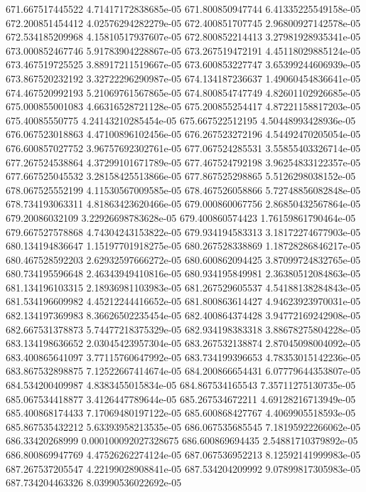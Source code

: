 {671.667517445522 4.71417172838685e-05
671.800850947744 6.41335225549158e-05
672.200851454412 4.02576294282279e-05
672.400851707745 2.96800927142578e-05
672.534185209968 4.15810517937607e-05
672.800852214413 3.27981928935341e-05
673.000852467746 5.91783904228867e-05
673.267519472191 4.45118029885124e-05
673.467519725525 3.88917211519667e-05
673.600853227747 3.65399244606939e-05
673.867520232192 3.32722296290987e-05
674.134187236637 1.49060454836641e-05
674.467520992193 5.21069761567865e-05
674.800854747749 4.82601102926685e-05
675.000855001083 4.66316528721128e-05
675.200855254417 4.87221158817203e-05
675.40085550775 4.24143210285454e-05
675.667522512195 4.50448993428936e-05
676.067523018863 4.47100896102456e-05
676.267523272196 4.54492470205054e-05
676.600857027752 3.96757692302761e-05
677.067524285531 3.55855403326714e-05
677.267524538864 4.37299101671789e-05
677.467524792198 3.96254833122357e-05
677.667525045532 3.28158425513866e-05
677.867525298865 5.5126298038152e-05
678.067525552199 4.11530567009585e-05
678.467526058866 5.72748856082848e-05
678.734193063311 4.81863423620466e-05
679.000860067756 2.86850432567864e-05
679.20086032109 3.22926698783628e-05
679.400860574423 1.76159861790464e-05
679.667527578868 4.74304243153822e-05
679.934194583313 3.18172274677903e-05
680.134194836647 1.15197701918275e-05
680.267528338869 1.18728286846217e-05
680.467528592203 2.62932597666272e-05
680.600862094425 3.87099724832765e-05
680.734195596648 2.46343949410816e-05
680.934195849981 2.36380512084863e-05
681.134196103315 2.18936981103983e-05
681.267529605537 4.54188138284843e-05
681.534196609982 4.45212244416652e-05
681.800863614427 4.94623923970031e-05
682.134197369983 8.36626502235454e-05
682.400864374428 3.94772169242908e-05
682.667531378873 5.74477218375329e-05
682.934198383318 3.88678275804228e-05
683.134198636652 2.03045423957304e-05
683.267532138874 2.87045098004092e-05
683.400865641097 3.77115760647992e-05
683.734199396653 4.78353015142236e-05
683.867532898875 7.12522667414674e-05
684.200866654431 6.07779644353807e-05
684.534200409987 4.8383455015834e-05
684.867534165543 7.35711275130735e-05
685.067534418877 3.4126447789644e-05
685.267534672211 4.69128216713949e-05
685.400868174433 7.17069480197122e-05
685.600868427767 4.4069905518593e-05
685.867535432212 5.63393958213535e-05
686.067535685545 7.18195922266062e-05
686.33420268999 0.000100092027328675
686.600869694435 2.54881710379892e-05
686.800869947769 4.47526262274124e-05
687.067536952213 8.12592141999983e-05
687.267537205547 4.22199028908841e-05
687.534204209992 9.07899817305983e-05
687.734204463326 8.03990536022692e-05
}
